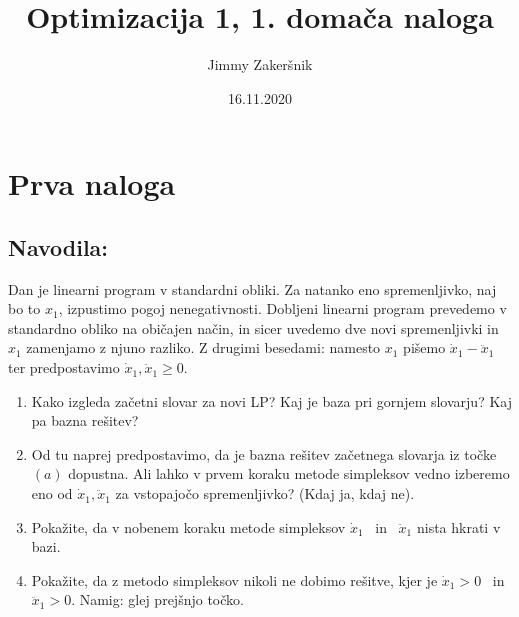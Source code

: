 \documentclass[a4paper, 10pt]{article}
\title{Optimizacija 1, 1. domača naloga}
\date{16.11.2020}
\author{Jimmy Zakeršnik}
\begin{document}
\maketitle
\newpage

\section{Prva naloga}
\subsection{Navodila:}
Dan je linearni program v standardni obliki. Za natanko eno spremenljivko, naj bo to $x_1$, izpustimo pogoj nenegativnosti. Dobljeni linearni program prevedemo v standardno obliko na običajen način, in sicer uvedemo dve novi spremenljivki in $x_1$ zamenjamo z njuno razliko. Z drugimi besedami: namesto $x_1$ pišemo $\dot{x}_1 - \ddot{x}_1$ ter predpostavimo $\dot{x}_1, \ddot{x}_1 \geq 0$.
\begin{enumerate}[label=(\alph*)]
	\item Kako izgleda začetni slovar za novi LP? Kaj je baza pri gornjem slovarju? Kaj pa bazna rešitev?
	\item Od tu naprej predpostavimo, da je bazna rešitev začetnega slovarja iz točke $(a)$ dopustna.  Ali lahko v prvem koraku metode simpleksov vedno izberemo eno od $\dot{x}_1, \ddot{x}_1$ za vstopajočo spremenljivko? (Kdaj ja, kdaj ne).
	\item Pokažite, da v nobenem koraku metode simpleksov $\dot{x}_1$ ~in~ $\ddot{x}_1$ nista hkrati v bazi.
	\item Pokažite, da z metodo simpleksov nikoli ne dobimo rešitve, kjer je $\dot{x}_1 > 0$ ~in~ $\ddot{x}_1 > 0$. \newline Namig: glej prejšnjo točko.
\end{enumerate}
\end{document}

